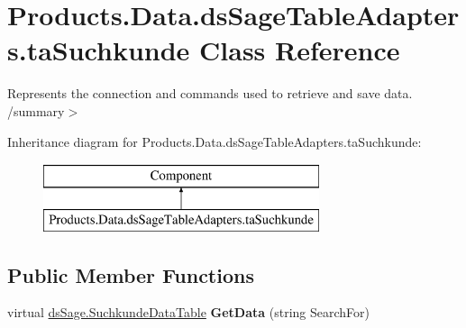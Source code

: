 \hypertarget{class_products_1_1_data_1_1ds_sage_table_adapters_1_1ta_suchkunde}{}\section{Products.\+Data.\+ds\+Sage\+Table\+Adapters.\+ta\+Suchkunde Class Reference}
\label{class_products_1_1_data_1_1ds_sage_table_adapters_1_1ta_suchkunde}


Represents the connection and commands used to retrieve and save data. /summary$>$  


Inheritance diagram for Products.\+Data.\+ds\+Sage\+Table\+Adapters.\+ta\+Suchkunde\+:\begin{figure}[H]
\begin{center}
\leavevmode
\includegraphics[height=2.000000cm]{class_products_1_1_data_1_1ds_sage_table_adapters_1_1ta_suchkunde}
\end{center}
\end{figure}
\subsection*{Public Member Functions}
\begin{DoxyCompactItemize}
\item 
virtual \hyperlink{class_products_1_1_data_1_1ds_sage_1_1_suchkunde_data_table}{ds\+Sage.\+Suchkunde\+Data\+Table} {\bfseries Get\+Data} (string Search\+For)\hypertarget{class_products_1_1_data_1_1ds_sage_table_adapters_1_1ta_suchkunde_aaef02eafe02df33a490e9e8bf6f3f7e6}{}\label{class_products_1_1_data_1_1ds_sage_table_adapters_1_1ta_suchkunde_aaef02eafe02df33a490e9e8bf6f3f7e6}

\end{DoxyCompactItemize}
